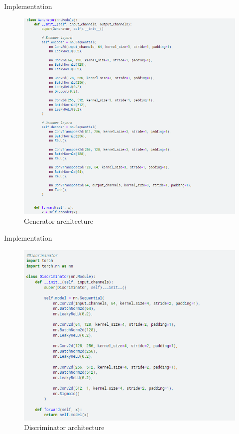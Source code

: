 \documentclass[xcolor=dvipsnames]{beamer}
\begin{document}
\begin{frame}{Implementation}
\begin{figure}
    \centering
    \includegraphics[scale = 0.35]{ppt/Gen.png}
    \caption{Generator architecture}
    \label{fig:enter-label}
\end{figure}
\end{frame}

\begin{frame}{Implementation}
\begin{figure}
    \centering
    \includegraphics[scale = 0.45]{ppt/Dis.png}
    \caption{Discriminator architecture}
    \label{fig:enter-label}
\end{figure}
\end{frame}
\end{document}
